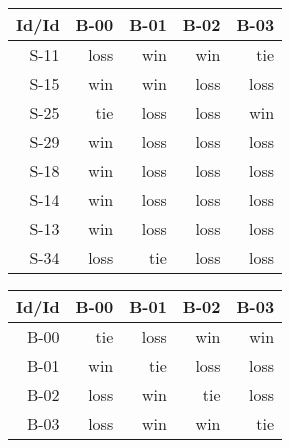 \begin{tabular}{ | r | r | r | r | r | }
    \hline
        Id/Id  &   B-00  &   B-01  &   B-02  &   B-03  \\
    \hline
    \hline
         S-11  &   loss  &    win  &    win  &    tie  \\
    \hline
         S-15  &    win  &    win  &   loss  &   loss  \\
    \hline
         S-25  &    tie  &   loss  &   loss  &    win  \\
    \hline
         S-29  &    win  &   loss  &   loss  &   loss  \\
    \hline
         S-18  &    win  &   loss  &   loss  &   loss  \\
    \hline
         S-14  &    win  &   loss  &   loss  &   loss  \\
    \hline
         S-13  &    win  &   loss  &   loss  &   loss  \\
    \hline
         S-34  &   loss  &    tie  &   loss  &   loss  \\
    \hline
\end{tabular}


\begin{tabular}{ | r | r | r | r | r | }
    \hline
        Id/Id  &   B-00  &   B-01  &   B-02  &   B-03  \\
    \hline
    \hline
         B-00  &    tie  &   loss  &    win  &    win  \\
    \hline
         B-01  &    win  &    tie  &   loss  &   loss  \\
    \hline
         B-02  &   loss  &    win  &    tie  &   loss  \\
    \hline
         B-03  &   loss  &    win  &    win  &    tie  \\
    \hline
\end{tabular}




